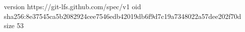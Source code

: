 version https://git-lfs.github.com/spec/v1
oid sha256:8e37545ca5b2082924cee7546edb42019db6f9d7c19a7348022a57dee202f70d
size 53
